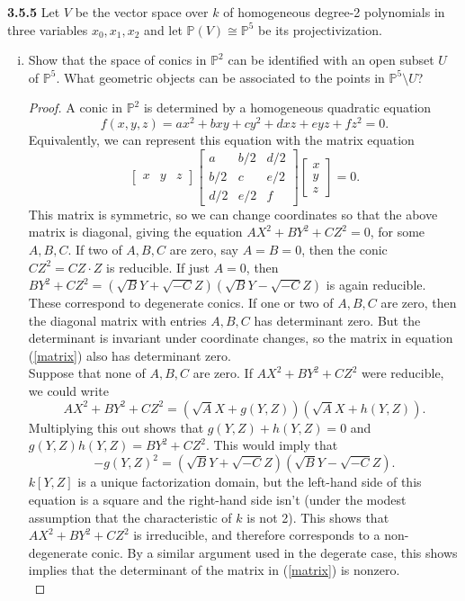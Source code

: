 \documentclass[11pt,letterpaper]{report}
\newcommand{\proj}{\mathbb{P}}
\begin{document}
\noindent\textbf{3.5.5}
Let $V$ be the vector space over $k$ of homogeneous degree-2 polynomials in three variables $x_0, x_1, x_2$ and let $\proj(V) \cong \proj^5$ be its projectivization.
\begin{enumerate}[(i)]
	\item Show that the space of conics in $\proj^2$ can be identified with an open subset $U$ of $\proj^5$. What geometric objects can be associated to the points in $\proj^5\setminus U$?
	\begin{proof}
		A conic in $\proj^2$ is determined by a homogeneous quadratic equation
		\[
		f(x,y,z) = ax^2 + bxy + cy^2 + dxz+eyz+fz^2 = 0.
		\]
		Equivalently, we can represent this equation with the matrix equation
		\begin{equation}\label{matrix}
		\begin{bmatrix}
			x & y & z
		\end{bmatrix}\begin{bmatrix}
			a & b/2 & d/2\\
			b/2 & c & e/2\\
			d/2 & e/2 & f
		\end{bmatrix}\begin{bmatrix}
			x\\y\\z
		\end{bmatrix} = 0.
		\end{equation}
		This matrix is symmetric, so we can change coordinates so that the above matrix is diagonal, giving the equation $AX^2+BY^2 +CZ^2 = 0$, for some $A,B,C$. If two of $A,B,C$ are zero, say $A=B=0$, then the conic $CZ^2 = CZ\cdot Z$ is reducible. If just $A = 0$, then $BY^2 + CZ^2 = (\sqrt{B}Y + \sqrt{-C}Z)(\sqrt{B}Y - \sqrt{-C}Z)$ is again reducible. These correspond to degenerate conics. If one or two of $A,B,C$ are zero, then the diagonal matrix with entries $A,B,C$ has determinant zero. But the determinant is invariant under coordinate changes, so the matrix in equation (\ref{matrix}) also has determinant zero.\\

		\noindent Suppose that none of $A,B,C$ are zero. If $AX^2+BY^2+CZ^2$ were reducible, we could write
		\[
		AX^2+BY^2+CZ^2 = (\sqrt{A}X + g(Y,Z))(\sqrt{A}X+h(Y,Z)).
		\]
		Multiplying this out shows that $g(Y,Z)+h(Y,Z) = 0$ and $g(Y,Z)h(Y,Z) = BY^2+CZ^2$. This would imply that
		\[
		-g(Y,Z)^2 = (\sqrt{B}Y + \sqrt{-C}Z)(\sqrt{B}Y-\sqrt{-C}Z).
		\]
		$k[Y,Z]$ is a unique factorization domain, but the left-hand side of this equation is a square and the right-hand side isn't (under the modest assumption that the characteristic of $k$ is not 2). This shows that $AX^2+BY^2+CZ^2$ is irreducible, and therefore corresponds to a non-degenerate conic. By a similar argument used in the degerate case, this shows implies that the determinant of the matrix in (\ref{matrix}) is nonzero.\\


\end{proof}
\end{enumerate}
\end{document}
